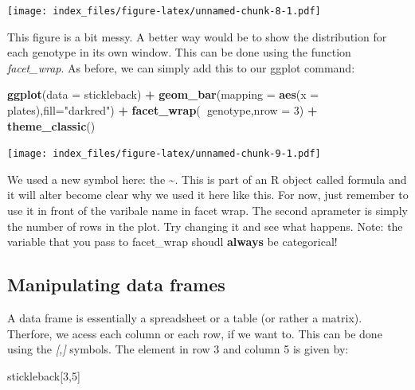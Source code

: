 \documentclass[]{article}
\newenvironment{Shaded}{\begin{snugshade}}{\end{snugshade}}
\newcommand{\DataTypeTok}[1]{\textcolor[rgb]{0.13,0.29,0.53}{#1}}
\newcommand{\DecValTok}[1]{\textcolor[rgb]{0.00,0.00,0.81}{#1}}
\newcommand{\KeywordTok}[1]{\textcolor[rgb]{0.13,0.29,0.53}{\textbf{#1}}}
\newcommand{\NormalTok}[1]{#1}
\newcommand{\OperatorTok}[1]{\textcolor[rgb]{0.81,0.36,0.00}{\textbf{#1}}}
\newcommand{\StringTok}[1]{\textcolor[rgb]{0.31,0.60,0.02}{#1}}
\begin{document}
\texttt{[image: index\_files/figure-latex/unnamed-chunk-8-1.pdf]}

This figure is a bit messy. A better way would be to show the
distribution for each genotype in its own window. This can be done using
the function \emph{facet\_wrap}. As before, we can simply add this to
our ggplot command:

\begin{Shaded}
\begin{Highlighting}[]
\KeywordTok{ggplot}\NormalTok{(}\DataTypeTok{data =}\NormalTok{ stickleback) }\OperatorTok{+}\StringTok{ }
\StringTok{  }\KeywordTok{geom_bar}\NormalTok{(}\DataTypeTok{mapping =} \KeywordTok{aes}\NormalTok{(}\DataTypeTok{x =}\NormalTok{ plates),}\DataTypeTok{fill=}\StringTok{"darkred"}\NormalTok{) }\OperatorTok{+}\StringTok{ }
\StringTok{  }\KeywordTok{facet_wrap}\NormalTok{(}\OperatorTok{~}\NormalTok{genotype,}\DataTypeTok{nrow =} \DecValTok{3}\NormalTok{) }\OperatorTok{+}
\StringTok{  }\KeywordTok{theme_classic}\NormalTok{()}
\end{Highlighting}
\end{Shaded}

\texttt{[image: index\_files/figure-latex/unnamed-chunk-9-1.pdf]}

We used a new symbol here: the \textasciitilde{}. This is part of an R
object called formula and it will alter become clear why we used it here
like this. For now, just remember to use it in front of the varibale
name in facet wrap. The second aprameter is simply the number of rows in
the plot. Try changing it and see what happens. Note: the variable that
you pass to facet\_wrap shoudl \textbf{always} be categorical!

\hypertarget{manipulating-data-frames}{%
\subsection{Manipulating data frames}\label{manipulating-data-frames}}

A data frame is essentially a spreadsheet or a table (or rather a
matrix). Therfore, we acess each column or each row, if we want to. This
can be done using the \emph{{[},{]}} symbols. The element in row 3 and
column 5 is given by:

\begin{Shaded}
\begin{Highlighting}[]
\NormalTok{stickleback[}\DecValTok{3}\NormalTok{,}\DecValTok{5}\NormalTok{]}
\end{Highlighting}
\end{Shaded}
\end{document}
